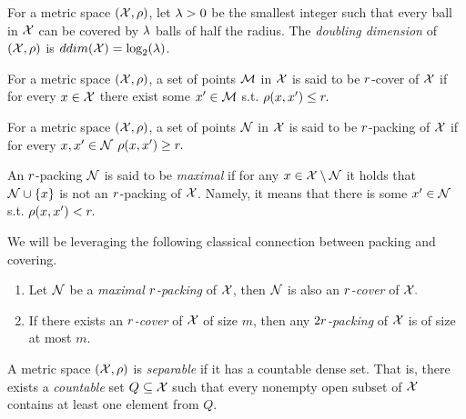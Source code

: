 \documentclass[12pt,a4paper,oneside,onecolumn]{book}
\begin{document}
\begin{definition}
\label{def:doubling}
For a metric space $(\mathcal{X},\rho)$, let $\lambda > 0$ be the smallest integer such that every ball in $\mathcal{X}$ can be covered by $\lambda$ balls of half the radius.
The \emph{doubling dimension} of $(\mathcal{X},\rho)$ is 
$ddim(\mathcal{X}) = \log_2(\lambda)$.
\end{definition}

\begin{definition}
For a metric space $(\mathcal{X},\rho)$, a set of points
$\mathcal{M}$ %
in $\mathcal{X}$  is said to be $r$-cover of $\mathcal{X}$ if 
for every $x\in\mathcal{X}$ there exist some $x'\in \mathcal{M}$ s.t.
$\rho(x,x') \leq r.$
\end{definition}

\begin{definition}
For a metric space $(\mathcal{X},\rho)$, a set of points
$\mathcal{N}$ %
in $\mathcal{X}$  is said to be $r$-packing of $\mathcal{X}$ if 
for every $x,x'\in\mathcal{N}$
$\rho(x,x') \geq r.$

An $r$-packing $\mathcal{N}$ is said to be {\em maximal} if for any $x\in\mathcal{X}\setminus\mathcal{N}$ it holds that $\mathcal{N}\cup\{x\}$ is not an $r$-packing of $\mathcal{X}$. 
Namely, it means that there is some $x'\in\mathcal{N}$ s.t. $\rho(x,x') < r.$
\end{definition}

We will be leveraging the following classical connection between packing and covering.

\begin{theorem}\label{thm:coverPacking}
\phantom{blah}
\begin{enumerate}
    \item Let $\mathcal{N}$ be a {\em maximal $r$-packing} of $\mathcal{X}$,
    then $\mathcal{N}$ is also an {\em $r$-cover} of $\mathcal{X}.$
    \item If there exists an {\em $r$-cover} of $\mathcal{X}$ of size $m$, then any {\em $2r$-packing} of $\mathcal{X}$ is of  size at most $m$.
\end{enumerate}
\end{theorem}

\begin{definition}
A metric space $(\mathcal{X},\rho)$ is {\em separable} if it has a countable dense set. That is, there exists a {\em countable} set $Q\subseteq\mathcal{X}$ such that every nonempty open subset of $\mathcal{X}$ contains at least one element from $Q$.
\end{definition}
\end{document}
